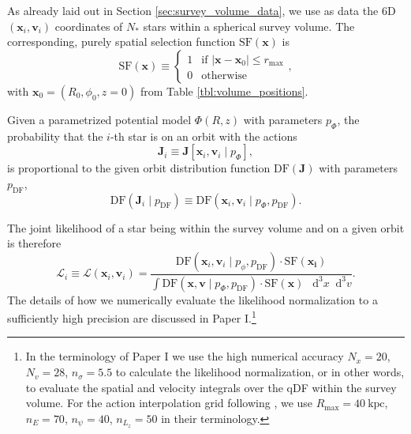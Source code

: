 \documentclass[iop,revtex4,numberedappendix,appendixfloats]{emulateapj}
\newcommand{\vect}[1]{\boldsymbol{#1}}
\newcommand*\Diff[1]{\mathop{}\!\mathrm{d^#1}}
\begin{document}
As already laid out in Section \ref{sec:survey_volume_data}, we use as data the 6D $(\vect{x}_i,\vect{v}_i)$ coordinates of $N_*$ stars within a spherical survey volume. The corresponding, purely spatial selection function $\text{SF}(\vect{x})$ is
\begin{equation}
\text{SF}(\vect{x}) \equiv \begin{cases} 1 &\mbox{if } \left| \vect{x}-\vect{x}_0 \right| \leq r_\text{max} \\
0 & \mbox{otherwise} \end{cases},
\end{equation}
with $\vect{x}_0 = (R_0,\phi_0,z=0)$ from Table \ref{tbl:volume_positions}.

Given a parametrized potential model $\Phi(R,z)$ with parameters $p_\Phi$, the probability that the $i$-th star is on an orbit with the actions 
\begin{equation}
\vect{J}_i \equiv \vect{J}[\vect{x}_i,\vect{v}_i \mid p_\Phi],
\end{equation}
is proportional to the given orbit distribution function $\text{DF}(\vect{J})$ with parameters $p_\text{DF}$,
\begin{equation}
\text{DF}(\vect{J}_i \mid p_\text{DF}) \equiv \text{DF}(\vect{x}_i,\vect{v}_i \mid p_\Phi,p_\text{DF}).
\end{equation}

The joint likelihood of a star being within the survey volume and on a given orbit is therefore
\begin{equation}
\mathscr{L}_i \equiv \mathscr{L}(\vect{x}_i,\vect{v}_i) = \frac{\text{DF}(\vect{x}_i,\vect{v}_i\mid p_\phi, p_\text{DF}) \cdot \text{SF}(\vect{x_i})}{\int \text{DF}(\vect{x},\vect{v}\mid p_\Phi, p_\text{DF}) \cdot \text{SF}(\vect{x}) \ \Diff3 x \Diff3 v}.
\end{equation}
The details of how we numerically evaluate the likelihood normalization to a sufficiently high precision are discussed in Paper I.\footnote{In the terminology of Paper I we use the high numerical accuracy $N_x = 20$, $N_v = 28$, $n_\sigma = 5.5$ to calculate the likelihood normalization, or in other words, to evaluate the spatial and velocity integrals over the qDF within the survey volume. For the action interpolation grid following \citet{2015ApJS..216...29B}, we use $R_\text{max}=40~\text{kpc}$, $n_E=70$, $n_\psi=40$, $n_{L_z}=50$ in their terminology.}
\end{document}
